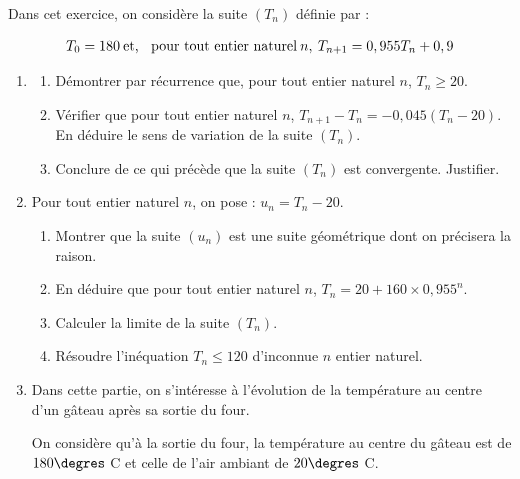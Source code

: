 \medskip

Dans cet exercice, on considère la suite $\left(T_n\right)$ définie par :

\[T_0 = 180 \:\text{et, \: pour tout entier naturel} \:n, \: T_{n+1} = 0,955T_n + 0,9\]

\begin{enumerate}
\item 
	\begin{enumerate}
		\item Démontrer par récurrence que, pour tout entier naturel $n$,\: $T_n \geqslant 20$.
		\item Vérifier que pour tout entier naturel $n$,\: $T_{n+1} -  T_n  = - 0,045\left(T_n - 20\right)$. En déduire le sens de variation de la suite $\left(T_n\right)$.
		\item Conclure de ce qui précède que la suite $\left(T_n\right)$ est convergente. Justifier.
	\end{enumerate}	
\item Pour tout entier naturel $n$, on pose : $u_n =  T_n - 20$.
	\begin{enumerate}
		\item Montrer que la suite $\left(u_n\right)$ est une suite géométrique dont on précisera la raison.
		\item En déduire que pour tout entier naturel $n$, \:$T_n =  20 + 160 \times  0,955^n$.
		\item Calculer la limite de la suite $\left(T_n\right)$.
		\item Résoudre l'inéquation $T_n \leqslant 120$ d'inconnue $n$ entier naturel.
	\end{enumerate}	
\item Dans cette partie, on s'intéresse à l'évolution de la température au centre d'un gâteau après sa sortie du four. 

On considère qu'à la sortie du four, la température au centre du gâteau est de $180 \degres$ C et celle de l'air ambiant de $20 \degres$ C.


\end{enumerate}
